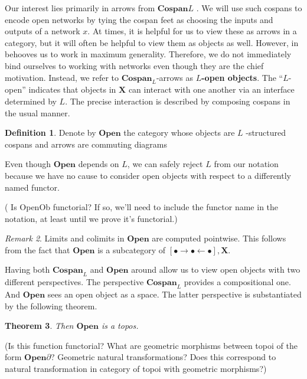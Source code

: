 \documentclass{amsart}
\newcommand{\X}{\cat{X}}
\newcommand{\defn}[1]{\textbf{#1}}
\newcommand{\cat}[1]{\mathbf{#1}}
\newcommand{\diagram}[1]{\raisebox{-0.5\height}{\texttt{[image: \#1]}}}
\newcommand{\Cospan}{\mathbf{Cospan}}
\newcommand{\OpenOb}{\mathbf{Open} }
\newcommand{\edit}[1]{\textcolor{editcolour}{(#1)}}
\newtheorem{theorem}{Theorem}[section]
\theoremstyle{remark}
\newtheorem{remark}[theorem]{Remark}
\theoremstyle{definition}
\newtheorem{definition}[theorem]{Definition}
\begin{document}
Our interest lies primarily in arrows from \( \Cospan L \) .  We will
use such cospans to encode open networks by tying the cospan feet as
choosing the inputs and outputs of a network $ x $. At times, it is
helpful for us to view these as arrows in a category, but it will
often be helpful to view them as objects as well.  However, in
behooves us to work in maximum generality. Therefore, we do not
immediately bind ourselves to working with networks even though they
are the chief motivation.  Instead, we refer to $ \Cospan_L $-arrows
as \defn{$ L $-open objects}.  The ``\( L \)-open'' indicates that
objects in $ \X $ can interact with one another via an interface
determined by $ L $.  The precise interaction is described by
composing cospans in the usual manner.

\begin{definition} \label{df:open-objects}
  Denote by $ \OpenOb $ the category whose objects are \( L \)
  -structured cospans and arrows are commuting diagrams
  
  Even though \( \OpenOb \) depends on \( L \), we can safely reject
  \( L \) from our notation because we have no cause to consider open
  objects with respect to a differently named functor.

  \edit{ Is OpenOb functorial? If so, we'll need to include the
    functor name in the notation, at least until we prove it's functorial.}
\end{definition}

\begin{remark} \label{thm:open-obj-ptwise-limits}
  Limits and colimits in \( \OpenOb \) are computed pointwise. This
  follows from the fact that \( \OpenOb \) is a subcategory of \(
  \left[ \bullet \to \bullet \gets \bullet \right] , \X \).   
\end{remark}

Having both $ \Cospan_L $ and $ \OpenOb $ around allow us to view open
objects with two different perspectives.  The perspective \( \Cospan_L
\) provides a compositional one. And \( \OpenOb \) sees an open object
as a space. The latter perspective is substantiated by the following
theorem.

\begin{theorem} \label{thm:OpenObTopos}
  Then $ \OpenOb $ is a topos.
\end{theorem}

\edit{Is this function functorial?  What are geometric morphisms
  between topoi of the form $ \OpenOb{\partial} $?  Geometric natural
  transformations?  Does this correspond to natural transformation in
  category of topoi with geometric morphisms?}
\end{document}
